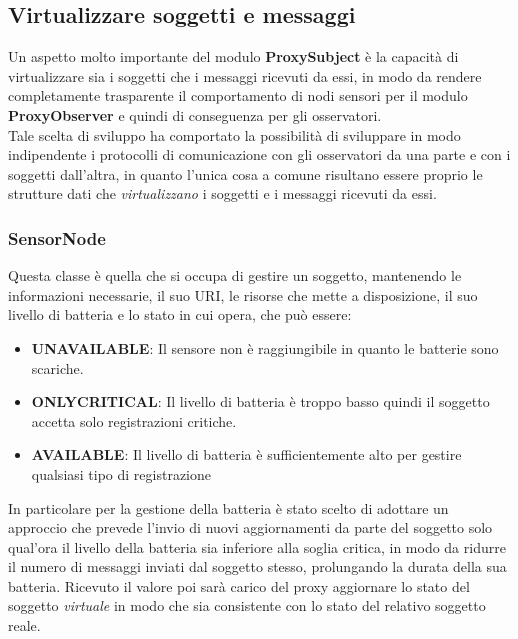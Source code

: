\subsection{Virtualizzare soggetti e messaggi}
Un aspetto molto importante del modulo \textbf{ProxySubject} è la capacità di virtualizzare sia i soggetti che i messaggi ricevuti da essi, in modo da rendere completamente trasparente il comportamento di nodi sensori per il modulo \textbf{ProxyObserver} e quindi di conseguenza per gli osservatori. \\
Tale scelta di sviluppo ha comportato la possibilità di sviluppare in modo indipendente i protocolli di comunicazione con gli osservatori da una parte e con i soggetti dall'altra, in quanto l'unica cosa a comune risultano essere proprio le strutture dati che \textit{virtualizzano} i soggetti e i messaggi ricevuti da essi.
\subsubsection{SensorNode}
Questa classe è quella che si occupa di gestire un soggetto, mantenendo le informazioni necessarie, il suo URI, le risorse che mette a disposizione, il suo livello di batteria e lo stato in cui opera, che può essere:
\begin{itemize}
  \item \textbf{UNAVAILABLE}: Il sensore non è raggiungibile in quanto le batterie sono scariche.
  \item \textbf{ONLYCRITICAL}: Il livello di batteria è troppo basso quindi il soggetto accetta solo registrazioni critiche.
  \item \textbf{AVAILABLE}: Il livello di batteria è sufficientemente alto per gestire qualsiasi tipo di registrazione
\end{itemize}

In particolare per la gestione della batteria è stato scelto di adottare un approccio che prevede l'invio di nuovi aggiornamenti da parte del soggetto solo qual'ora il livello della batteria sia inferiore alla soglia critica, in modo da ridurre il numero di messaggi inviati dal soggetto stesso, prolungando la durata della sua batteria. Ricevuto il valore poi sarà carico del proxy aggiornare lo stato del soggetto \textit{virtuale} in modo che sia consistente con lo stato del relativo soggetto reale. \\

